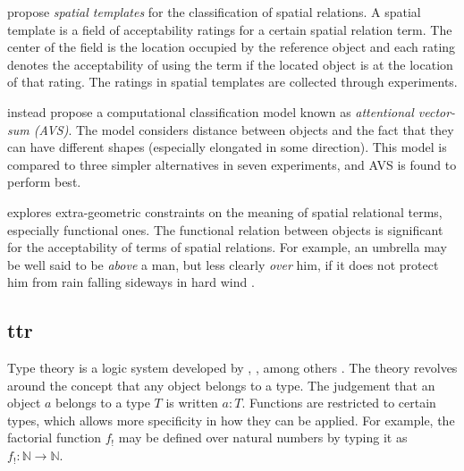 
\cite{LoganComputationalAnalysisApprehension1996} propose \textit{spatial templates} for the classification of spatial relations.
A spatial template is a field of acceptability ratings for a certain spatial relation term.
The center of the field is the location occupied by the reference object and each rating denotes the acceptability of using the term if the located object is at the location of that rating.
The ratings in spatial templates are collected through experiments.

\cite{RegierGroundingspatiallanguage2001a} instead propose a computational classification model known as \textit{attentional vector-sum (AVS)}.
The model considers distance between objects and the fact that they can have different shapes (especially elongated in some direction).
This model is compared to three simpler alternatives in seven experiments, and AVS is found to perform best.

\cite{CoventryInterplayGeometryFunction2001} explores extra-geometric constraints on the meaning of spatial relational terms, especially functional ones.
The functional relation between objects is significant for the acceptability of terms of spatial relations.
For example, an umbrella may be well said to be \textit{above} a man, but less clearly \textit{over} him, if it does not protect him from rain falling sideways in hard wind \citep{CoventryInterplayGeometryFunction2001}.




\subsection{\Gls{ttr}}
\label{sec:ttnlp}

Type theory is a logic system developed by \cite{WhiteheadPrincipiamathematica1910}, \cite{church40}, \cite{martinlof84} among others \citep{CoquandTypeTheory2015}.
The theory revolves around the concept that any object belongs to a type.
The judgement that an object $a$ belongs to a type $T$ is written $a:T$.
Functions are restricted to certain types, which allows more specificity in how they can be applied.
For example, the factorial function $f_!$ may be defined over natural numbers by typing it as $f_! :\mathbb{N} \rightarrow \mathbb{N}$.

